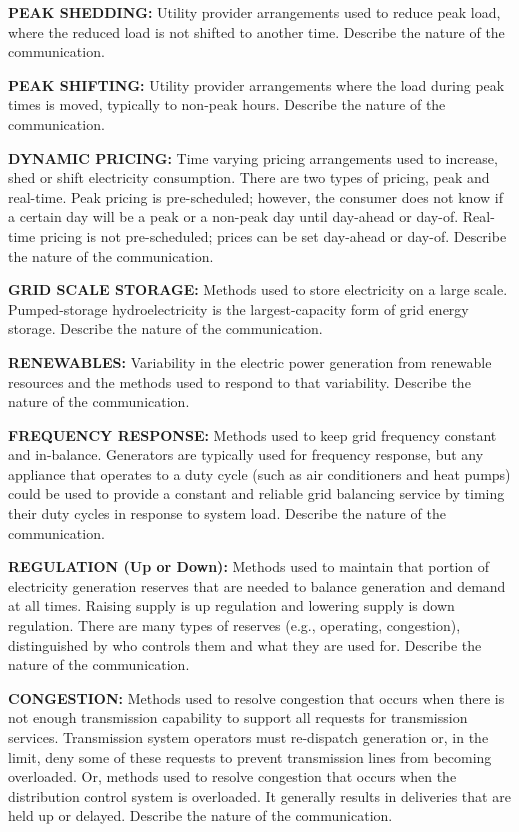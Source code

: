 \wl
\noindent
\textbf{PEAK SHEDDING:}  Utility provider arrangements used to reduce peak load, where the 
reduced load is not shifted to another time. 
Describe the nature of the communication.

\wl
\noindent
\textbf{PEAK SHIFTING:}  Utility provider arrangements where the load during peak times is moved, typically 
to non-peak hours. 
Describe the nature of the communication.	

\wl
\noindent
\textbf{DYNAMIC PRICING:}  Time varying pricing arrangements used to increase, shed or shift electricity 
consumption. There are two types of pricing, peak and real-time.  Peak pricing is pre-scheduled; 
however, the consumer does not know if a certain day will be a peak or a non-peak day until day-ahead 
or day-of.  Real-time pricing is not pre-scheduled; prices can be set day-ahead or day-of.	
Describe the nature of the communication.	

\wl
\noindent
\textbf{GRID SCALE STORAGE:}  Methods used to store electricity on a large scale. Pumped-storage 
hydroelectricity is the largest-capacity form of grid energy storage. 
Describe the nature of the communication.	

\wl
\noindent
\textbf{RENEWABLES:}  Variability in the electric power generation from renewable resources 
and the methods used to respond to that variability. 
Describe the nature of the communication.	

\wl
\noindent
\textbf{FREQUENCY RESPONSE:}  Methods used to keep grid frequency constant and in-balance. 
Generators are typically used for frequency response, but any appliance that operates 
to a duty cycle (such as air conditioners and heat pumps) could be used to provide 
a constant and reliable grid balancing service by timing their duty cycles in response 
to system load.   	
Describe the nature of the communication.	

\wl
\noindent
\textbf{REGULATION (Up or Down):} Methods used to maintain that portion of electricity generation 
reserves that are needed to balance generation and demand at all times.  Raising supply 
is up regulation and lowering supply is down regulation. There are many types of reserves 
(e.g., operating, congestion), distinguished by who controls them and what they are used for. 
Describe the nature of the communication.	

\wl
\noindent
\textbf{CONGESTION:} Methods used to resolve congestion that occurs when there is not enough 
transmission capability to support all requests for transmission services. Transmission 
system operators must re-dispatch generation or, in the limit, deny some of these 
requests to prevent transmission lines from becoming overloaded.  Or, methods used to 
resolve congestion that occurs when the distribution control system is overloaded.  It 
generally results in deliveries that are held up or delayed.     
Describe the nature of the communication.

